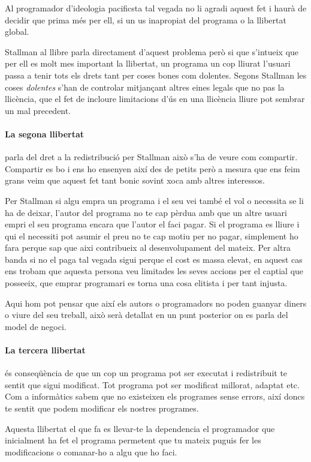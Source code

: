 \documentclass[a4paper,11pt]{scrartcl}
\begin{document}
Al programador d'ideologia pacificsta tal vegada no li agradi aquest
fet i haurà de decidir que prima més per ell, si un us inapropiat del
programa o la llibertat global.

Stallman al llibre parla directament d'aquest problema però si que
s'intueix que per ell es molt mes important la llibertat, un programa
un cop lliurat l'usuari passa a tenir tots els drets tant per coses
bones com dolentes. Segons Stallman les coses \emph{dolentes}
s'han de controlar mitjançant altres eines legals que no pas la llicència,
que el fet de incloure limitacions d'ús en una llicència lliure
pot sembrar un mal precedent.

\paragraph{La segona llibertat} parla del dret a la redistribució per Stallman
això s'ha de veure com compartir. Compartir es bo i ens ho ensenyen
així des de petits però a mesura que ens feim grans veim que aquest
fet tant bonic sovint xoca amb altres interessos.

Per Stallman si algu empra un programa i el seu vei també el vol
o necessita se li ha de deixar, l'autor del programa no te cap pèrdua
amb que un altre usuari empri el seu programa encara que l'autor
el faci pagar. Si el programa es lliure i qui el necessiti pot
asumir el preu no te cap motiu per no pagar, simplement ho fara
perque sap que aixi contribueix al desenvolupament del mateix.
Per altra banda si no el paga tal vegada sigui perque el cost
es massa elevat, en aquest cas ens trobam que aquesta persona
veu limitades les seves accions per el captial que posseeix,
que emprar programari es torna una cosa elitista i per tant injusta.

Aqui hom pot pensar que així els autors o programadors no
poden guanyar diners o viure del seu treball, això serà detallat
en un punt posterior on es parla del model de negoci.

\paragraph{La tercera llibertat} és conseqüència de que
un cop un programa pot ser executat i redistribuit te sentit que 
sigui modificat. Tot programa pot ser modificat millorat, adaptat
etc. Com a informàtics sabem que no existeixen els programes
sense errors, així doncs te sentit que podem modificar els nostres programes.

Aquesta llibertat el que fa es llevar-te la dependencia el programador 
que inicialment ha fet el programa permetent que tu mateix puguis
fer les modificacions o comanar-ho a algu que ho faci.
\end{document}
